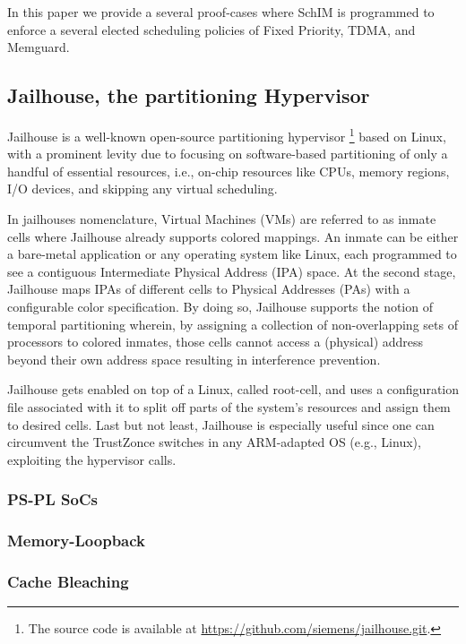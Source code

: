 In this paper we provide a several proof-cases where SchIM is programmed to enforce a several elected scheduling policies of Fixed Priority, TDMA, and Memguard. 






\subsection{Jailhouse, the partitioning Hypervisor}
Jailhouse is a well-known open-source partitioning hypervisor \footnote{The source code is available at \url{https://github.com/siemens/jailhouse.git}.} based on Linux,
 with a prominent levity due to focusing on software-based partitioning of only a handful of essential resources, i.e., on-chip resources like CPUs, memory regions, I/O devices, and skipping any virtual scheduling.

In jailhouses 
nomenclature, Virtual Machines (VMs) are referred to as inmate cells where Jailhouse already supports colored mappings. An inmate can be either a bare-metal application or any operating system like Linux, each programmed to see a contiguous Intermediate Physical Address (IPA) space. At the second stage, Jailhouse maps IPAs of different cells to Physical Addresses (PAs) with a configurable color specification. By doing so, Jailhouse supports the notion of temporal partitioning wherein, by assigning a collection of non-overlapping sets of processors to colored inmates, those cells cannot access a (physical) address beyond their own address space resulting in interference prevention.

Jailhouse gets enabled on top of a Linux, called root-cell, and uses a configuration file associated with it to split off parts of the system's resources and assign them to desired cells. Last but not least, Jailhouse is especially useful since one can circumvent the TrustZonce switches in any ARM-adapted OS (e.g., Linux), exploiting the hypervisor calls.

\subsubsection{PS-PL SoCs}
\subsubsection{Memory-Loopback}
\subsubsection{Cache Bleaching}
